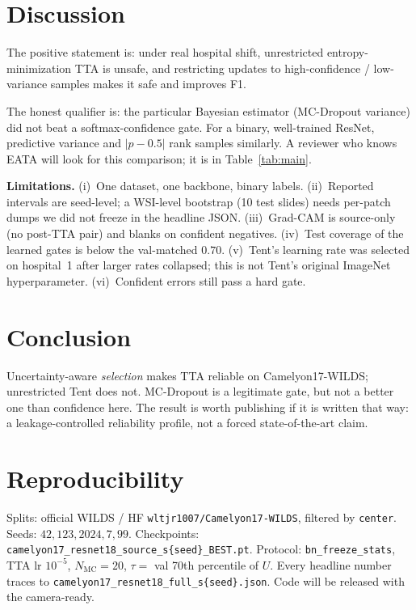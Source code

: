 \documentclass[conference]{IEEEtran}
\begin{document}
\section{Discussion}

The positive statement is: under real hospital shift, unrestricted entropy-minimization TTA is unsafe, and restricting updates to high-confidence / low-variance samples makes it safe and improves F1.

The honest qualifier is: the particular Bayesian estimator (MC-Dropout variance) did not beat a softmax-confidence gate.
For a binary, well-trained ResNet, predictive variance and $|p-0.5|$ rank samples similarly.
A reviewer who knows EATA will look for this comparison; it is in Table~\ref{tab:main}.

\textbf{Limitations.}
(i)~One dataset, one backbone, binary labels.
(ii)~Reported intervals are seed-level; a WSI-level bootstrap (10 test slides) needs per-patch dumps we did not freeze in the headline JSON.
(iii)~Grad-CAM is source-only (no post-TTA pair) and blanks on confident negatives.
(iv)~Test coverage of the learned gates is below the val-matched $0.70$.
(v)~Tent's learning rate was selected on hospital~1 after larger rates collapsed; this is not Tent's original ImageNet hyperparameter.
(vi)~Confident errors still pass a hard gate.

\section{Conclusion}

Uncertainty-aware \emph{selection} makes TTA reliable on Camelyon17-WILDS; unrestricted Tent does not.
MC-Dropout is a legitimate gate, but not a better one than confidence here.
The result is worth publishing if it is written that way: a leakage-controlled reliability profile, not a forced state-of-the-art claim.

\section*{Reproducibility}
Splits: official WILDS / HF \texttt{wltjr1007/Camelyon17-WILDS}, filtered by \texttt{center}.
Seeds: $42,123,2024,7,99$.
Checkpoints: \texttt{camelyon17\_resnet18\_source\_s\{seed\}\_BEST.pt}.
Protocol: \texttt{bn\_freeze\_stats}, TTA lr $10^{-5}$, $N_{\mathrm{MC}}=20$, $\tau=$ val 70th percentile of $U$.
Every headline number traces to \texttt{camelyon17\_resnet18\_full\_s\{seed\}.json}.
Code will be released with the camera-ready.
\end{document}
